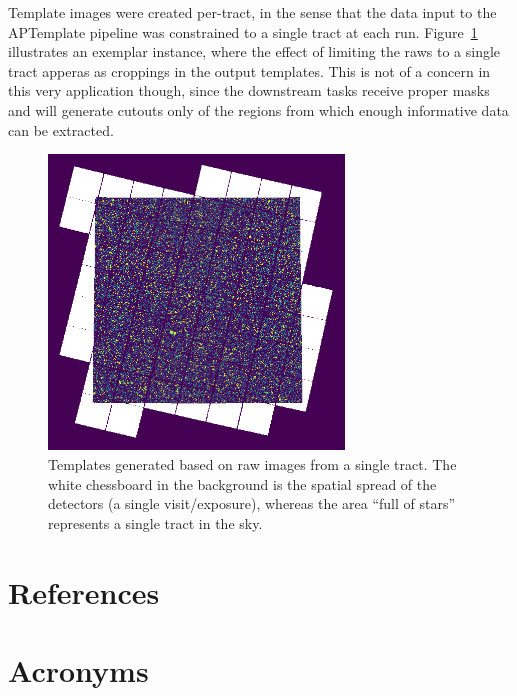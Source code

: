 \documentclass[DM,authoryear,toc]{lsstdoc}
\begin{document}
Template images were created per-tract, in the sense that the data input to the APTemplate pipeline was constrained to a single tract at each run. Figure~\ref{fig:tract_templates} illustrates an exemplar instance, where the effect of limiting the raws to a single tract apperas as croppings in the output templates. This is not of a concern in this very application though, since the downstream tasks receive proper masks and will generate cutouts only of the regions from which enough informative data can be extracted.

\begin{figure}[h]
  \centering
  \includegraphics[width=0.7\textwidth]{tract_templates.png}
  \caption{Templates generated based on raw images from a single tract. The white chessboard in the background is the spatial spread of the detectors (a single visit/exposure), whereas the area ``full of stars'' represents a single tract in the sky.}
  \label{fig:tract_templates}
\end{figure}


\appendix
\section{References} \label{sec:bib}
\renewcommand{\refname}{} %


\section{Acronyms} \label{sec:acronyms}

\end{document}
